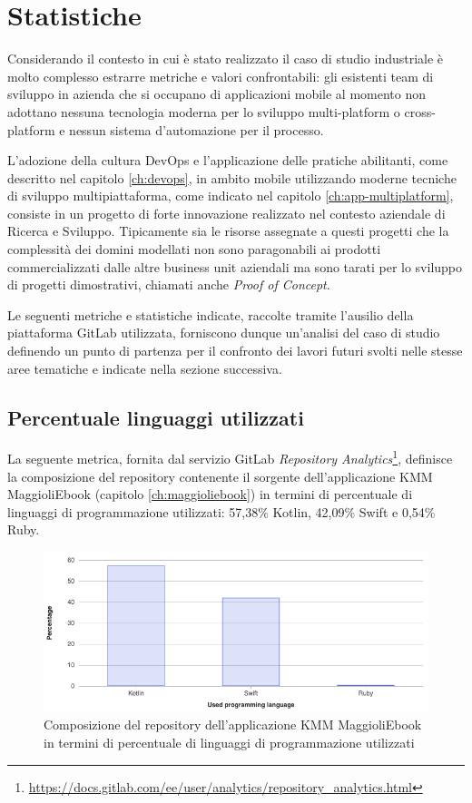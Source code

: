 \section{Statistiche}
Considerando il contesto in cui è stato realizzato il caso di studio industriale è molto complesso estrarre metriche e valori confrontabili: 
gli esistenti team di sviluppo in azienda che si occupano di applicazioni mobile al momento non adottano nessuna tecnologia moderna per lo sviluppo multi-platform o cross-platform e nessun sistema d'automazione per il processo.

L'adozione della cultura DevOps e l'applicazione delle pratiche abilitanti,
come descritto nel capitolo \ref{ch:devops}, 
in ambito mobile utilizzando moderne tecniche di sviluppo multipiattaforma, 
come indicato nel capitolo \ref{ch:app-multiplatform}, 
consiste in un progetto di forte innovazione realizzato nel contesto aziendale di Ricerca e Sviluppo. 
Tipicamente sia le risorse assegnate a questi progetti che la complessità dei domini modellati non sono paragonabili ai prodotti commercializzati dalle altre business unit aziendali ma sono tarati per lo sviluppo di progetti dimostrativi, 
chiamati anche \textit{Proof of Concept}.

Le seguenti metriche e statistiche indicate, 
raccolte tramite l'ausilio della piattaforma GitLab utilizzata, 
forniscono dunque un'analisi del caso di studio definendo un punto di partenza per il confronto dei lavori futuri svolti nelle stesse aree tematiche e indicate nella sezione successiva.

\subsection*{Percentuale linguaggi utilizzati}
La seguente metrica, 
fornita dal servizio GitLab \textit{Repository Analytics}\footnote{\href{https://docs.gitlab.com/ee/user/analytics/repository\_analytics.html}{https://docs.gitlab.com/ee/user/analytics/repository\_analytics.html}}, 
definisce la composizione del repository contenente il sorgente dell'applicazione KMM MaggioliEbook (capitolo \ref{ch:maggioliebook}) in termini di percentuale di linguaggi di programmazione utilizzati: 
57,38\% Kotlin, 
42,09\% Swift e 0,54\% Ruby.

\begin{figure}[H]
\centering
    \includegraphics[width=1\textwidth]{img/repo-code-lang-percent.png}
    \caption{Composizione del repository dell'applicazione KMM MaggioliEbook in termini di percentuale di linguaggi di programmazione utilizzati}
    \label{repo-code-lang-percent}
\end{figure}

